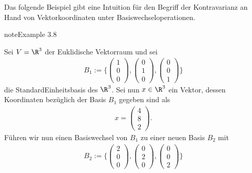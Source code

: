 \documentclass[letterpaper,10pt,english]{jupyterBook}
\begin{document}
\sphinxAtStartPar
Das folgende Beispiel gibt eine Intuition für den Begriff der Kontravarianz an Hand von Vektorkoordinaten unter Basiswechseloperationen.
\label{vektoranalysis/tensor:example-21}
\begin{sphinxadmonition}{note}{Example 3.8}



\sphinxAtStartPar
Sei \(V = \R^3\) der Euklidische Vektorraum und sei
\begin{equation*}
\begin{split}B_1 := \lbrace \begin{pmatrix}1\\ 0\\ 0\end{pmatrix}, \begin{pmatrix}0\\ 1\\ 0\end{pmatrix}, \begin{pmatrix}0\\ 0\\ 1\end{pmatrix} \rbrace\end{split}
\end{equation*}
\sphinxAtStartPar
die Standard\sphinxhyphen{}Einheitsbasis des \(\R^3\).
Sei nun \(x \in \R^3\) ein Vektor, dessen Koordinaten bezüglich der Basis \(B_1\) gegeben sind als
\begin{equation*}
\begin{split}x = \begin{pmatrix}4\\ 8\\ 2\end{pmatrix}.\end{split}
\end{equation*}
\sphinxAtStartPar
Führen wir nun einen Basiswechsel von \(B_1\) zu einer neuen Basis \(B_2\) mit
\begin{equation*}
\begin{split}B_2 := \lbrace \begin{pmatrix}2\\ 0\\ 0\end{pmatrix}, \begin{pmatrix}0\\ 2\\ 0\end{pmatrix}, \begin{pmatrix}0\\ 0\\ 2\end{pmatrix} \rbrace\end{split}

\end{equation*}
\end{sphinxadmonition}
\end{document}
